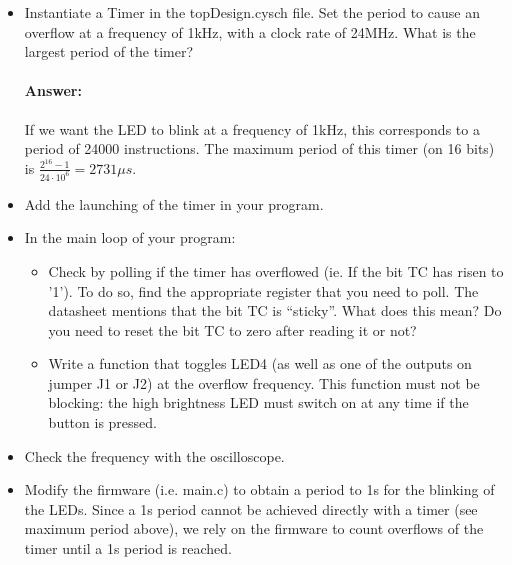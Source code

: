 \documentclass[11pt,a4paper]{article}
\theoremstyle{definition}%
\newcommand{\reponse}[1]{%
	\ifthenelse {\boolean{corrige}} {\paragraph{Answer:} \color{darkblue}   #1\color{black}} {}
 }
\begin{document}
\begin{itemize}
	\item Instantiate a Timer in the topDesign.cysch file. Set the period to cause an overflow at a frequency of 1kHz, with a clock rate of 24MHz. What is the largest period of the timer?
	\reponse{If we want the LED to blink at a frequency of 1kHz, this corresponds to a period of 24000 instructions. The maximum period of this timer (on 16 bits) is $\frac{2^{16}-1}{24\cdot10^6} = 2731 \mu s $. }
	\item Add the launching of the timer in your program.
	\item In the main loop of your program:
	\begin{itemize}
		\item Check by polling if the timer has overflowed (ie. If the bit TC has risen to '1'). To do so, find the appropriate register that you need to poll. The datasheet mentions that the bit TC is ``sticky''. What does this mean? Do you need to reset the bit TC to zero after reading it or not? 
		\item Write a function that toggles LED4 (as well as one of the outputs on jumper J1 or J2) at the overflow frequency. This function must not be blocking: the high brightness LED must switch on at any time if the button is pressed.
	\end{itemize}
	\item Check the frequency with the oscilloscope.
	\item Modify the firmware (i.e. main.c) to obtain a period to 1s for the blinking of the LEDs. Since a 1s period cannot be achieved directly with a timer (see maximum period above), we rely on the firmware to count overflows of the timer until a 1s period is reached. 
\end{itemize}
\end{document}
